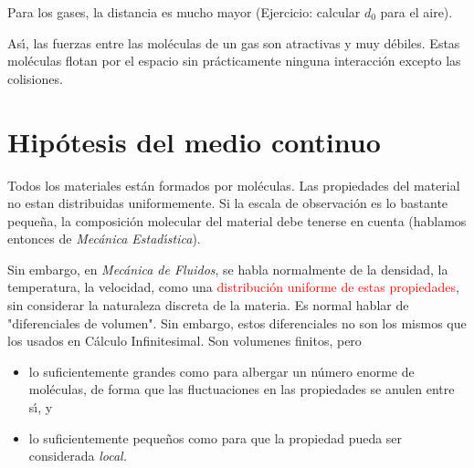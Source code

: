 Para los gases, la distancia es mucho mayor (Ejercicio: calcular $d_0$ para el aire).

As\'{\i}, las fuerzas entre las mol\'eculas de un gas son atractivas y muy d\'ebiles. Estas mol\'eculas
flotan por el espacio sin pr\'acticamente ninguna interacci\'on excepto las colisiones.

\section{Hipótesis del medio continuo}

Todos los materiales est\'an formados por mol\'eculas. Las propiedades del material no estan distribuidas
uniformemente. Si la escala de observaci\'on es lo bastante peque\~na, la composici\'on molecular del material
debe tenerse en cuenta (hablamos entonces de {\em Mec\'anica Estad\'{\i}stica}).

Sin embargo, en {\em Mec\'anica de Fluidos}, se habla normalmente de la densidad, la temperatura, la velocidad,
como una \textcolor{red}{distribuci\'on uniforme de estas propiedades}, sin considerar la naturaleza discreta de la materia. Es
normal hablar de "diferenciales de volumen". Sin embargo, estos diferenciales no son los mismos que los usados
en C\'alculo Infinitesimal. Son volumenes finitos, pero

\begin{itemize}
	\item lo suficientemente grandes como para albergar un n\'umero enorme de mol\'eculas, de forma que las fluctuaciones en las propiedades se anulen entre s\'{\i}, y
	\item lo suficientemente peque\~nos como para que la propiedad pueda ser considerada \em{local}.
\end{itemize}

